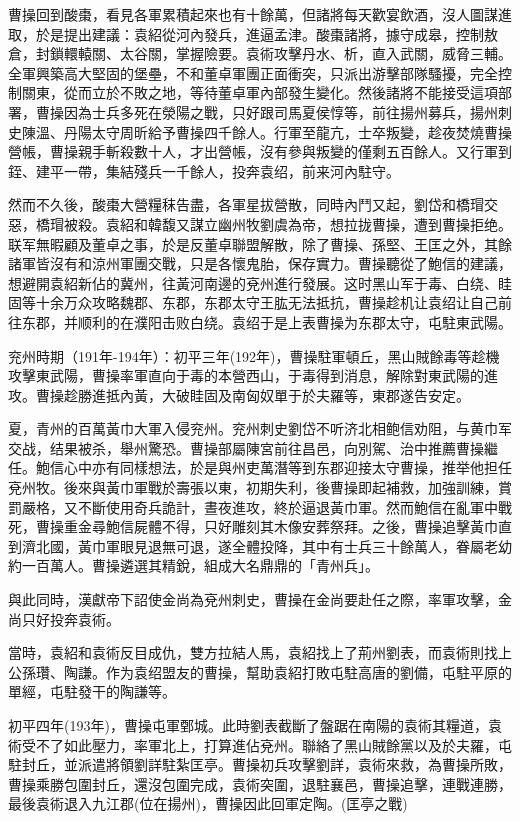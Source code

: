 曹操回到酸棗，看見各軍累積起來也有十餘萬，但諸將每天歡宴飲酒，沒人圖謀進取，於是提出建議：袁紹從河內發兵，進逼孟津。酸棗諸將，據守成皋，控制敖倉，封鎖轘轅關、太谷關，掌握險要。袁術攻擊丹水、析，直入武關，威脅三輔。全軍興築高大堅固的堡壘，不和董卓軍團正面衝突，只派出游擊部隊騷擾，完全控制關東，從而立於不敗之地，等待董卓軍內部發生變化。然後諸將不能接受這項部署，曹操因為士兵多死在滎陽之戰，只好跟司馬夏侯惇等，前往揚州募兵，揚州刺史陳溫、丹陽太守周昕給予曹操四千餘人。行軍至龍亢，士卒叛變，趁夜焚燒曹操營帳，曹操親手斬殺數十人，才出營帳，沒有參與叛變的僅剩五百餘人。又行軍到銍、建平一帶，集結殘兵一千餘人，投奔袁绍，前来河內駐守。

然而不久後，酸棗大營糧秣告盡，各軍星拔營散，同時內鬥又起，劉岱和橋瑁交惡，橋瑁被殺。袁紹和韓馥又謀立幽州牧劉虞為帝，想拉拢曹操，遭到曹操拒绝。联军無暇顧及董卓之事，於是反董卓聯盟解散，除了曹操、孫堅、王匡之外，其餘諸軍皆沒有和涼州軍團交戰，只是各懷鬼胎，保存實力。曹操聽從了鮑信的建議，想避開袁紹新佔的冀州，往黃河南邊的兗州進行發展。这时黑山军于毒、白绕、眭固等十余万众攻略魏郡、东郡，东郡太守王肱无法抵抗，曹操趁机让袁绍让自己前往东郡，并顺利的在濮阳击败白绕。袁绍于是上表曹操为东郡太守，屯駐東武陽。

兖州時期（191年-194年）：初平三年(192年)，曹操駐軍頓丘，黑山賊餘毒等趁機攻擊東武陽，曹操率軍直向于毒的本營西山，于毒得到消息，解除對東武陽的進攻。曹操趁勝進抵內黃，大破眭固及南匈奴單于於夫羅等，東郡遂告安定。

夏，青州的百萬黃巾大軍入侵兖州。兖州刺史劉岱不听济北相鲍信劝阻，与黄巾军交战，结果被杀，舉州驚恐。曹操部屬陳宮前往昌邑，向別駕、治中推薦曹操繼任。鮑信心中亦有同樣想法，於是與州吏萬潛等到东郡迎接太守曹操，推举他担任兗州牧。後來與黃巾軍戰於壽張以東，初期失利，後曹操即起補救，加強訓練，賞罰嚴格，又不斷使用奇兵詭計，晝夜進攻，終於逼退黃巾軍。然而鮑信在亂軍中戰死，曹操重金尋鮑信屍體不得，只好雕刻其木像安葬祭拜。之後，曹操追擊黃巾直到濟北國，黃巾軍眼見退無可退，遂全體投降，其中有士兵三十餘萬人，眷屬老幼約一百萬人。曹操遴選其精銳，組成大名鼎鼎的「青州兵」。

與此同時，漢獻帝下詔使金尚為兗州刺史，曹操在金尚要赴任之際，率軍攻擊，金尚只好投奔袁術。

當時，袁紹和袁術反目成仇，雙方拉結人馬，袁紹找上了荊州劉表，而袁術則找上公孫瓚、陶謙。作为袁绍盟友的曹操，幫助袁紹打敗屯駐高唐的劉備，屯駐平原的單經，屯駐發干的陶謙等。

初平四年(193年)，曹操屯軍鄄城。此時劉表截斷了盤踞在南陽的袁術其糧道，袁術受不了如此壓力，率軍北上，打算進佔兗州。聯絡了黑山賊餘黨以及於夫羅，屯駐封丘，並派遣將領劉詳駐紮匡亭。曹操初兵攻擊劉詳，袁術來救，為曹操所敗，曹操乘勝包圍封丘，還沒包圍完成，袁術突圍，退駐襄邑，曹操追擊，連戰連勝，最後袁術退入九江郡(位在揚州)，曹操因此回軍定陶。(匡亭之戰)

